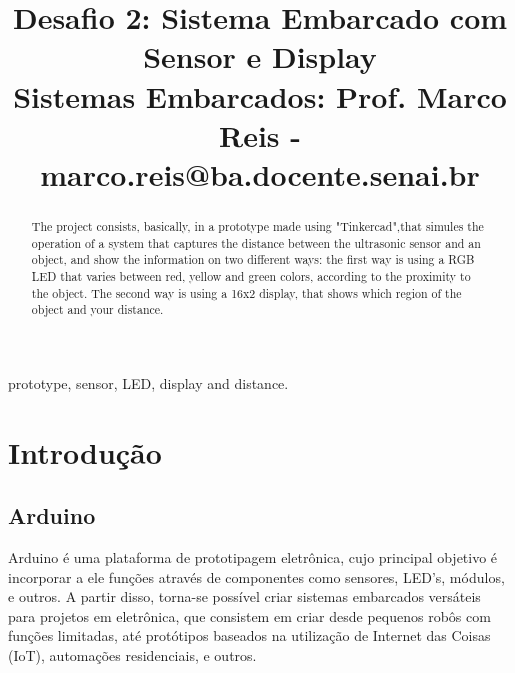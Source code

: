 \documentclass[conference]{IEEEtran}
\begin{document}
\title{Desafio 2: Sistema Embarcado com Sensor e Display\\
{\footnotesize Sistemas Embarcados: Prof. Marco Reis - marco.reis@ba.docente.senai.br}
}

\author{
}

\maketitle

\begin{abstract}
    
The project consists, basically, in a prototype made using "Tinkercad",that simules the operation of 
a system that captures the distance between the ultrasonic sensor and an object, and show the 
information on two different ways: the first way is using a RGB LED that varies between red, yellow 
and green colors, according to the proximity to the object. The second way is using a 16x2 display, 
that shows which region of the object and your distance.

\end{abstract}
    
\begin{IEEEkeywords}
    prototype, sensor, LED, display and distance.
\end{IEEEkeywords}
    
\section{Introdução}
\subsection{Arduino}

    Arduino é uma plataforma de prototipagem eletrônica, cujo principal objetivo é incorporar a ele 
funções através de componentes como sensores, LED's, módulos, e outros. A partir disso, torna-se 
possível criar sistemas embarcados versáteis para projetos em eletrônica, que consistem em criar desde 
pequenos robôs com funções limitadas, até protótipos baseados na utilização de Internet das Coisas (IoT),
automações residenciais, e outros.
\end{document}

